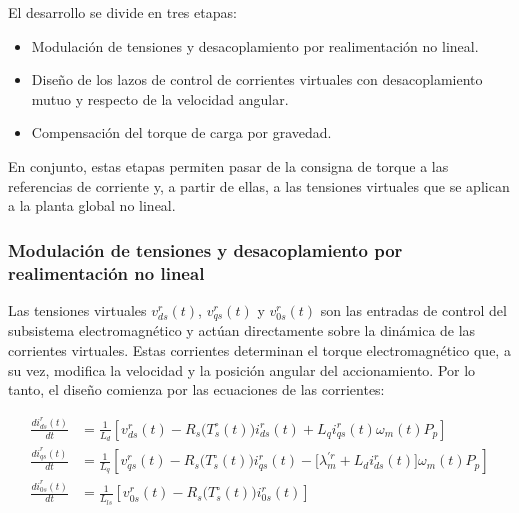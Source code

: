 \documentclass[blue,fullpaper]{ludusofficial}  %
\begin{document}
El desarrollo se divide en tres etapas:
\begin{itemize}
    \item Modulación de tensiones y desacoplamiento por realimentación no lineal.
    \item Diseño de los lazos de control de corrientes virtuales con desacoplamiento mutuo y respecto de la velocidad angular.
    \item Compensación del torque de carga por gravedad.
\end{itemize}

En conjunto, estas etapas permiten pasar de la consigna de torque a las referencias de corriente y, a partir de ellas, a las tensiones virtuales que se aplican a la planta global no lineal.



\subsubsection{Modulación de tensiones y desacoplamiento por realimentación no lineal}

Las tensiones virtuales $v_{ds}^{r}(t)$, $v_{qs}^{r}(t)$ y $v_{0s}^{r}(t)$ son las entradas de control del subsistema electromagnético y actúan directamente sobre la dinámica de las corrientes virtuales. Estas corrientes determinan el torque electromagnético que, a su vez, modifica la velocidad y la posición angular del accionamiento. Por lo tanto, el diseño comienza por las ecuaciones de las corrientes:

\begin{equation}
\label{eq:dinamica-corrientes}
\begin{aligned}
\frac{di_{ds}^{r}(t)}{dt} & = \frac{1}{L_{d}} \left[ v_{ds}^{r}(t) - R_{s} \Big( T_{s}^{\circ} (t) \Big) i_{ds}^{r}(t) + L_{q}i_{qs}^{r}(t) \omega_{m}(t)P_{p}  \right]  \\
\frac{di_{qs}^{r}(t)}{dt}  & = \frac{1}{L_{q} } \left[ v_{qs}^{r}(t) - R_{s} \Big( T_{s}^{\circ} (t) \Big) i_{qs}^{r}(t) - \big[ \lambda_{m}^{'r} + L_{d} i_{ds}^{r}(t) \big] \omega_{m}(t)P_{p} \right]  \\
\frac{di_{0s}^{r}(t)}{dt} & = \frac{1}{ L_{ls} } \left[ v_{0s}^{r}(t) - R_{s} \Big( T_{s}^{\circ} (t) \Big) i_{0s}^{r}(t) \right]
\end{aligned}
\end{equation}
\end{document}
